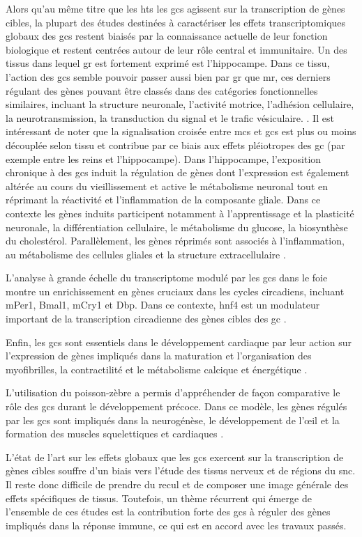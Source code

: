 \documentclass[../main.tex]{subfiles}
\begin{document}
Alors qu'au même titre que les \glspl{ht} les \glspl{gc} agissent sur la transcription de gènes cibles, la plupart des études destinées à caractériser les effets transcriptomiques globaux des \glspl{gc} restent biaisés par la connaissance actuelle de leur fonction biologique et restent centrées autour de leur rôle central et immunitaire.
Un des tissus dans lequel \gls{gr} est fortement exprimé est l'hippocampe.
Dans ce tissu, l'action des \glspl{gc} semble pouvoir passer aussi bien par \gls{gr} que \gls{mr}, ces derniers régulant des gènes pouvant être classés dans des catégories fonctionnelles similaires, incluant la structure neuronale, l'activité motrice, l'adhésion cellulaire, la neurotransmission, la transduction du signal et le trafic vésiculaire. \citep{Datson2001}.
Il est intéressant de noter que la signalisation croisée entre \glspl{mc} et \glspl{gc} est plus ou moins découplée selon tissu et contribue par ce biais aux effets pléiotropes des \gls{gc} (par exemple entre les reins et l'hippocampe).
Dans l'hippocampe, l'exposition chronique à des \glspl{gc} induit la régulation de gènes dont l'expression est également altérée au cours du vieillissement et active le métabolisme neuronal tout en réprimant la réactivité et l'inflammation de la composante gliale.
Dans ce contexte les gènes induits participent notamment à l'apprentissage et la plasticité neuronale, la différentiation cellulaire, le métabolisme du glucose, la biosynthèse du cholestérol.
Parallèlement, les gènes réprimés sont associés à l'inflammation, au métabolisme des cellules gliales et la structure extracellulaire \citep{Chen2013b,Carter2012}.
\par
L'analyse à grande échelle du transcriptome modulé par les \glspl{gc} dans le foie montre un enrichissement en gènes cruciaux dans les cycles circadiens, incluant mPer1, Bmal1, mCry1 et Dbp.
Dans ce contexte, \gls{hnf4} est un modulateur important de la transcription circadienne des gènes cibles des \gls{gc} \citep{Reddy2007}.
\par
Enfin, les \glspl{gc} sont essentiels dans le développement cardiaque par leur action sur l'expression de gènes impliqués dans la maturation et l'organisation des myofibrilles, la contractilité et le métabolisme calcique et énergétique \cite{Rog-Zielinska2013}.
\par
L'utilisation du poisson-zèbre a permis d'appréhender de façon comparative le rôle des \glspl{gc} durant le développement précoce.
Dans ce modèle, les gènes régulés par les \glspl{gc} sont impliqués dans la neurogénèse, le développement de l'œil et la formation des muscles squelettiques et cardiaques \citep{Nesan2013}.
\par
L'état de l'art sur les effets globaux que les \glspl{gc} exercent sur la transcription de gènes cibles souffre d'un biais vers l'étude des tissus nerveux et de régions du \gls{snc}.
Il reste donc difficile de prendre du recul et de composer une image générale des effets spécifiques de tissus.
Toutefois, un thème récurrent qui émerge de l'ensemble de ces études est la contribution forte des \glspl{gc} à réguler des gènes impliqués dans la réponse immune, ce qui est en accord avec les travaux passés.

\end{document}
